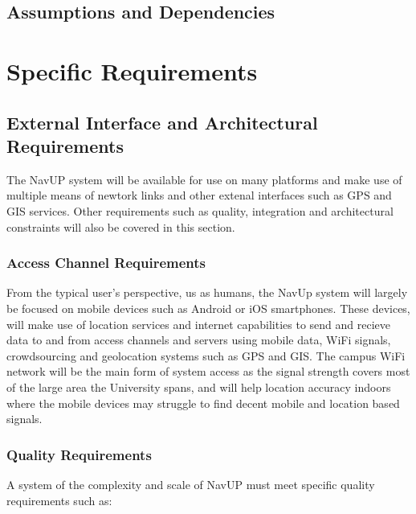 \documentclass[12pt,a4paper]{report}
\begin{document}
	\subsection*{Assumptions and Dependencies}

\newpage
\section*{Specific Requirements}

	\subsection*{External Interface and Architectural Requirements}
		
		The NavUP system will be available for use on many platforms and make use of multiple means of newtork links and other extenal interfaces such as GPS and GIS services.
		Other requirements such as quality, integration and architectural constraints will also be covered in this section.
		
			\subsubsection*{Access Channel Requirements}
				From the typical user's perspective, us as humans, the NavUp system will largely be focused on mobile devices such as Android or iOS smartphones.
				These devices, will make use of location services and internet capabilities to send and recieve data to and from access channels and servers using mobile data,
				WiFi signals, crowdsourcing and geolocation systems such as GPS and GIS. The campus WiFi network will be the main form of system access as the signal
				strength covers most of the large area the University spans, and will help location accuracy indoors where the mobile devices may struggle to find decent mobile
				and location based signals.
				
			\subsubsection*{Quality Requirements}
				A system of the complexity and scale of NavUP must meet specific quality requirements such as:
				
\end{document}
